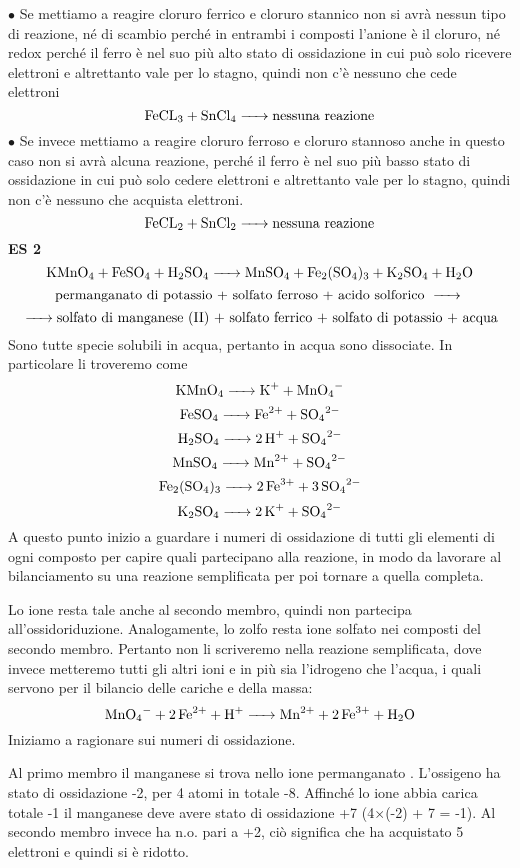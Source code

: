$\bullet$ Se mettiamo a reagire cloruro ferrico  e cloruro stannico  non si avrà nessun tipo di reazione, né di scambio perché in entrambi i composti l'anione è il cloruro, né redox perché il ferro è nel suo più alto stato di ossidazione in cui può solo ricevere elettroni e altrettanto vale per lo stagno, quindi non c'è nessuno che cede elettroni
$$\ce{FeCL_3 +  SnCl_4 ->}\text{nessuna reazione}$$
$\bullet$ Se invece mettiamo a reagire cloruro ferroso  e cloruro stannoso  anche in questo caso non si avrà alcuna reazione, perché il ferro è nel suo più basso stato di ossidazione in cui può solo cedere elettroni e altrettanto vale per lo stagno, quindi non c'è nessuno che acquista elettroni.
$$\ce{FeCL_2 + SnCl_2 ->}\text{nessuna reazione}$$
\textbf{ES 2}
$$\ce{KMnO_4 + FeSO_4 + H_2SO_4 -> MnSO_4 + Fe_2(SO_4)_3 + K_2SO_4 + H_2O}$$
$$\text{permanganato di potassio + solfato ferroso + acido solforico \ce{->}}$$
$$\ce{->}\text{solfato di manganese (II) + solfato ferrico + solfato di potassio + acqua}$$
Sono tutte specie solubili in acqua, pertanto in acqua sono dissociate. In particolare li troveremo come
$$\ce{KMnO_4 -> K^+ + MnO_4^-}$$
$$\ce{FeSO_4 -> Fe^{2+} + SO_4^{2-}}$$
$$\ce{H_2SO_4 -> 2 H^+ + SO_4^{2-}}$$
$$\ce{MnSO_4 -> Mn^{2+} + SO_4^{2-}}$$
$$\ce{Fe_2(SO_4)_3 -> 2 Fe^{3+} + 3 SO_4^{2-}}$$
$$\ce{K_2SO_4 -> 2 K^+ + SO_4^{2-}}$$
A questo punto inizio a guardare i numeri di ossidazione di tutti gli elementi di ogni composto per capire quali partecipano alla reazione, in modo da lavorare al bilanciamento su una reazione semplificata per poi tornare a quella completa.

Lo ione  resta tale anche al secondo membro, quindi non partecipa all'ossidoriduzione. Analogamente, lo zolfo resta ione solfato  nei composti del secondo membro. Pertanto non li scriveremo nella reazione semplificata, dove invece metteremo tutti gli altri ioni e in più sia l'idrogeno  che l'acqua, i quali servono per il bilancio delle cariche e della massa:
$$\ce{MnO_4- + 2Fe^2+ + H+ -> Mn^2+ + 2Fe^3+ + H_2O}$$
Iniziamo a ragionare sui numeri di ossidazione.

Al primo membro il manganese si trova nello ione permanganato . L'ossigeno ha stato di ossidazione -2, per 4 atomi in totale -8. Affinché lo ione abbia carica totale -1 il manganese deve avere stato di ossidazione +7 (4$\times$(-2) + 7 = -1). Al secondo membro invece ha n.o. pari a +2, ciò significa che ha acquistato 5 elettroni e quindi si è ridotto.

